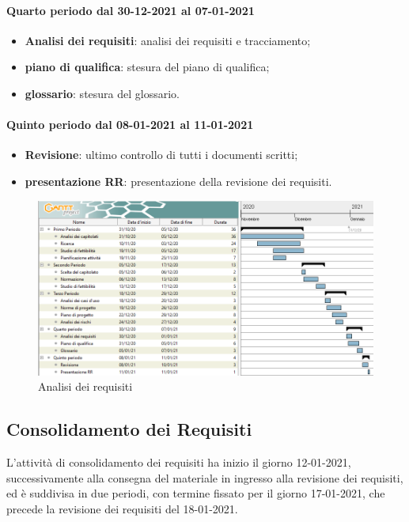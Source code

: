 	\paragraph{Quarto periodo dal 30-12-2021 al 07-01-2021}
	\begin{itemize}
	\item \textbf{Analisi dei requisiti}: analisi dei requisiti e tracciamento;
	\item \textbf{piano di qualifica}: stesura del piano di qualifica;
	\item \textbf{glossario}: stesura del glossario.
	\end{itemize}
	
	\paragraph{Quinto periodo dal 08-01-2021 al 11-01-2021}
	\begin{itemize}
	\item \textbf{Revisione}: ultimo controllo di tutti i documenti scritti;
	\item \textbf{presentazione RR}: presentazione della revisione dei requisiti.
	\end{itemize}
	
	
	\newpage
	
	\begin{landscape}
	\begin{figure}[h!]
	\includegraphics[width=24cm]{images/1_Analisi_dei_requisiti.png}
	\caption{Analisi dei requisiti}
	\end{figure}
	\end{landscape}
	
	\newpage
	
	\subsection{Consolidamento dei Requisiti}
	L'attività di consolidamento dei requisiti ha inizio il giorno 12-01-2021, successivamente alla consegna
	del materiale in ingresso alla revisione dei requisiti, ed è suddivisa in due periodi, con termine fissato
	per il giorno 17-01-2021, che precede la revisione dei requisiti del 18-01-2021.
	
